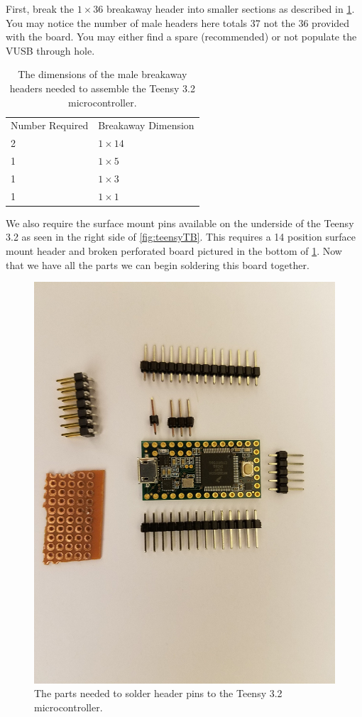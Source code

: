  First, break the $1 \times 36$ breakaway header into smaller sections as described in \cref{tab:teensyBreakaway}. You may notice the number of male headers here totals 37 not the 36 provided with the board. You may either find a spare (recommended) or not populate the VUSB through hole.
 
 \begin{table}[h!]
 \centering
\begin{tabular}{ll}
\rowcolor[HTML]{C0C0C0} 
Number Required & Breakaway Dimension \\
2               & $1 \times  14$              \\
\rowcolor[HTML]{C0C0C0} 
1               & $1 \times 5$               \\
1               & $1 \times 3$               \\
\rowcolor[HTML]{C0C0C0} 
1               & $1 \times 1$              
\end{tabular}
\caption{The dimensions of the male breakaway headers needed to assemble the Teensy 3.2 microcontroller. \label{tab:teensyBreakaway}}
\end{table}

We also require the surface mount pins available on the underside of the Teensy 3.2 as seen in the right side of \cref{fig:teensyTB}. This requires a 14 position surface mount header and broken perforated board pictured in the bottom of \cref{fig:teensyParts}. Now that we have all the parts we can begin soldering this board together.

\begin{figure}[h!]
\centering
\includegraphics[width=0.65\columnwidth, keepaspectratio]{./figs/20181119_160924.jpg}
\caption{The parts needed to solder header pins to the Teensy 3.2 microcontroller.}
\label{fig:teensyParts}
\end{figure}

